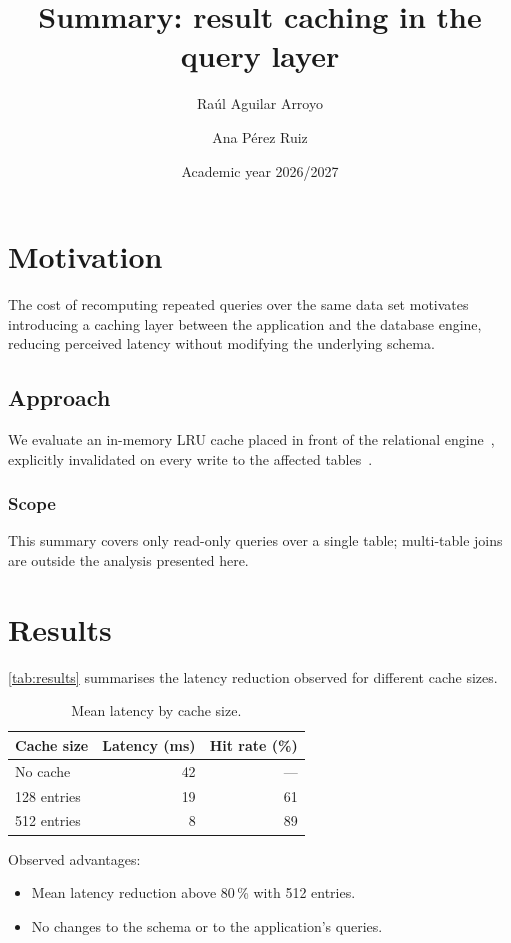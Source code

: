 \documentclass[10pt]{article}
\title{Summary: result caching in the query layer}
\author{Raúl Aguilar Arroyo \and Ana Pérez Ruiz}
\date{Academic year 2026/2027}
\begin{document}
\maketitle

\section{Motivation}

The cost of recomputing repeated queries over the same data set motivates
introducing a caching layer between the application and the database
engine, reducing perceived latency without modifying the underlying
schema.

\subsection{Approach}

We evaluate an in-memory LRU cache placed in front of the relational
engine~\cite{megiddo2003}, explicitly invalidated on every write to the
affected tables~\cite{silberschatz2019}.

\subsubsection{Scope} This summary covers only read-only queries over a
single table; multi-table joins are outside the analysis presented here.

\section{Results}

\autoref{tab:results} summarises the latency reduction observed for
different cache sizes.

\begin{table}[h]
  \centering
  \caption{Mean latency by cache size.}
  \label{tab:results}
  \begin{tabular}{@{}lrr@{}}
    \toprule
    Cache size & Latency (ms) & Hit rate (\%) \\
    \midrule
    No cache & 42 & --- \\
    128 entries & 19 & 61 \\
    512 entries & 8 & 89 \\
    \bottomrule
  \end{tabular}
\end{table}

Observed advantages:
\begin{itemize}
  \item Mean latency reduction above 80\,\% with 512 entries.
  \item No changes to the schema or to the application's queries.
\end{itemize}
\end{document}
